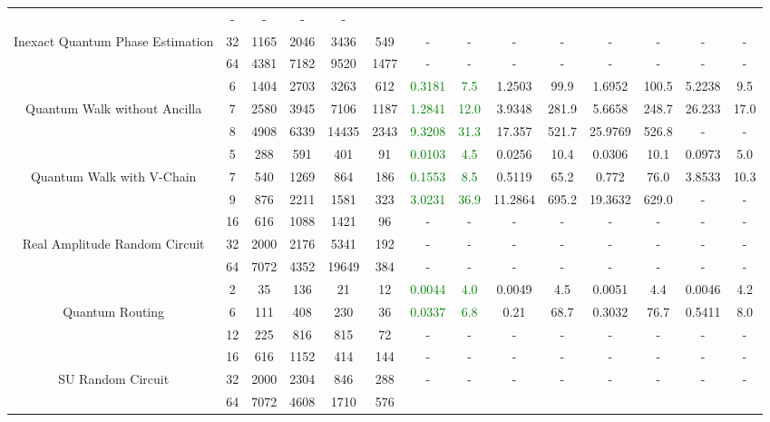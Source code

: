 \begin{table}[htb]
{\begin{tabular}{|c|c|c|c|c|c|c|c|c|c|c|c|c|c|}
 & - & -
 & - & -
 \\
Inexact Quantum Phase Estimation & 
32 & 1165 & 2046 & 3436 & 549
 & - & -
 & - & -
 & - & -
 & - & -
 \\
 & 
64 & 4381 & 7182 & 9520 & 1477
 & - & -
 & - & -
 & - & -
 & - & -
 \\
\hline
 & 
6 & 1404 & 2703 & 3263 & 612
 & \textcolor{green}{0.3181} & \textcolor{green}{7.5}
 & 1.2503 & 99.9
 & 1.6952 & 100.5
 & 5.2238 & 9.5
 \\
Quantum Walk without Ancilla & 
7 & 2580 & 3945 & 7106 & 1187
 & \textcolor{green}{1.2841} & \textcolor{green}{12.0}
 & 3.9348 & 281.9
 & 5.6658 & 248.7
 & 26.233 & 17.0
 \\
 & 
8 & 4908 & 6339 & 14435 & 2343
 & \textcolor{green}{9.3208} & \textcolor{green}{31.3}
 & 17.357 & 521.7
 & 25.9769 & 526.8
 & - & -
 \\
\hline
 & 
5 & 288 & 591 & 401 & 91
 & \textcolor{green}{0.0103} & \textcolor{green}{4.5}
 & 0.0256 & 10.4
 & 0.0306 & 10.1
 & 0.0973 & 5.0
 \\
Quantum Walk with V-Chain & 
7 & 540 & 1269 & 864 & 186
 & \textcolor{green}{0.1553} & \textcolor{green}{8.5}
 & 0.5119 & 65.2
 & 0.772 & 76.0
 & 3.8533 & 10.3
 \\
 & 
9 & 876 & 2211 & 1581 & 323
 & \textcolor{green}{3.0231} & \textcolor{green}{36.9}
 & 11.2864 & 695.2
 & 19.3632 & 629.0
 & - & -
 \\
\hline
 & 
16 & 616 & 1088 & 1421 & 96
 & - & -
 & - & -
 & - & -
 & - & -
 \\
Real Amplitude Random Circuit & 
32 & 2000 & 2176 & 5341 & 192
 & - & -
 & - & -
 & - & -
 & - & -
 \\
 & 
64 & 7072 & 4352 & 19649 & 384
 & - & -
 & - & -
 & - & -
 & - & -
 \\
\hline
 & 
2 & 35 & 136 & 21 & 12
 & \textcolor{green}{0.0044} & \textcolor{green}{4.0}
 & 0.0049 & 4.5
 & 0.0051 & 4.4
 & 0.0046 & 4.2
 \\
Quantum Routing & 
6 & 111 & 408 & 230 & 36
 & \textcolor{green}{0.0337} & \textcolor{green}{6.8}
 & 0.21 & 68.7
 & 0.3032 & 76.7
 & 0.5411 & 8.0
 \\
 & 
12 & 225 & 816 & 815 & 72
 & - & -
 & - & -
 & - & -
 & - & -
 \\
\hline
 & 
16 & 616 & 1152 & 414 & 144
 & - & -
 & - & -
 & - & -
 & - & -
 \\
SU Random Circuit & 
32 & 2000 & 2304 & 846 & 288
 & - & -
 & - & -
 & - & -
 & - & -
 \\
 & 
64 & 7072 & 4608 & 1710 & 576

\end{tabular}}
\end{table}
